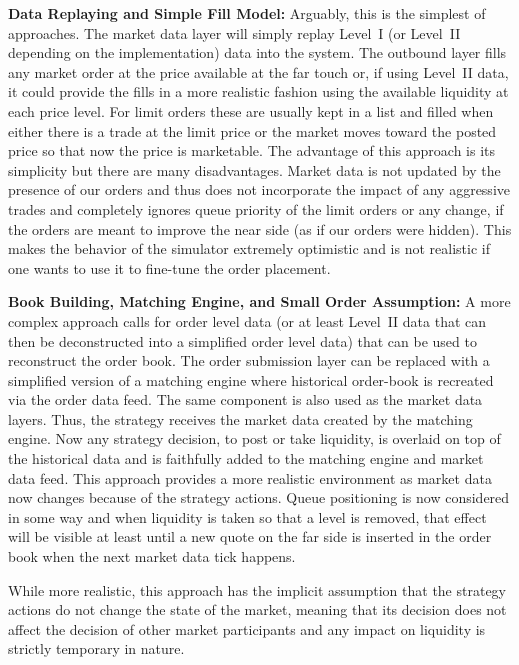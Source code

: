 \noindent\textbf{Data Replaying and Simple Fill Model:} Arguably, this is the simplest of approaches. The market data layer will simply replay Level~I (or Level~II depending on the implementation) data into the system. The outbound layer fills any market order at the price available at the far touch or, if using Level~II data, it could provide the fills in a more realistic fashion using the available liquidity at each price level. For limit orders these are usually kept in a list and filled when either there is a trade at the limit price or the market moves toward the posted price so that now the price is marketable. The advantage of this approach is its simplicity but there are many disadvantages. Market data is not updated by the presence of our orders and thus does not incorporate the impact of any aggressive trades and completely ignores queue priority of the limit orders or any change, if the orders are meant to improve the near side (as if our orders were hidden). This makes the behavior of the simulator extremely optimistic and is not realistic if one wants to use it to fine-tune the order placement. \twomedskip


\noindent\textbf{Book Building, Matching Engine, and Small Order Assumption:}\label{in:matcheng2} A more complex approach calls for order level data (or at least Level~II data that can then be deconstructed into a simplified order level data) that can be used to reconstruct the order book. The order submission layer can be replaced with a simplified version of a matching engine where historical order-book is recreated via the order data feed. The same component is also used as the market data layers. Thus, the strategy receives the market data created by the matching engine. Now any strategy decision, to post or take liquidity, is overlaid on top of the historical data and is faithfully added to the matching engine and market data feed. This approach provides a more realistic environment as market data now changes because of the strategy actions. Queue positioning is now considered in some way and when liquidity is taken so that a level is removed, that effect will be visible at least until a new quote on the far side is inserted in the order book when the next market data tick happens.


While more realistic, this approach has the implicit assumption that the strategy actions do not change the state of the market, meaning that its decision does not affect the decision of other market participants and any impact on liquidity is strictly temporary in nature. \twomedskip


